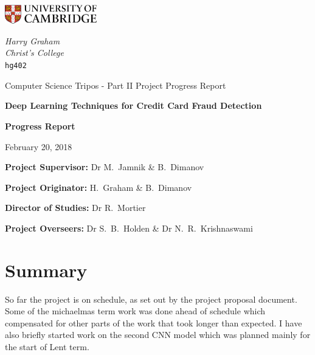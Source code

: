 \documentclass[12pt,a4paper,twoside]{article}
\begin{document}
\begin{titlepage}
	\noindent
	\begin{minipage}[t][][t]{0.5\textwidth}
		\includegraphics[width=40mm]{CamLogo.jpg}
	\end{minipage}
	\begin{minipage}{0.5\textwidth}
	\begin{flushright}
		\large
		\textit{Harry Graham}
		\\
		\textit{Christ's College}
		\\
		\texttt{hg402}
	\end{flushright}
	\end{minipage}
	
	\begin{center}
	\vspace{6cm}
	{\sc\large Computer Science Tripos - Part II Project Progress Report \par}
	\vspace{0.5cm}
	{\huge\bf Deep Learning Techniques for Credit Card Fraud Detection\par}
	\vspace{0.5cm}
	{\huge\bf Progress Report\par}
	\vspace{0.5cm}
	{\large February 20, 2018 \par}
	\end{center}
	
	\vfill
	
	\begin{flushleft}
		\textbf{Project Supervisor:} Dr M.~Jamnik \& B.~Dimanov
		
		\textbf{Project Originator:}  H.~Graham \& B.~Dimanov

		\textbf{Director of Studies:}  Dr R.~Mortier

		\textbf{Project Overseers:} Dr S.~B.~Holden  \& Dr N.~R.~Krishnaswami
	\end{flushleft}
	
	\vspace{1.5cm}
\end{titlepage}

\section*{Summary}
So far the project is on schedule, as set out by the project proposal document. Some of the michaelmas term work was done ahead of schedule which compensated for other parts of the work that took longer than expected. I have also briefly started work on the second CNN model which was planned mainly for the start of Lent term. 
\end{document}

